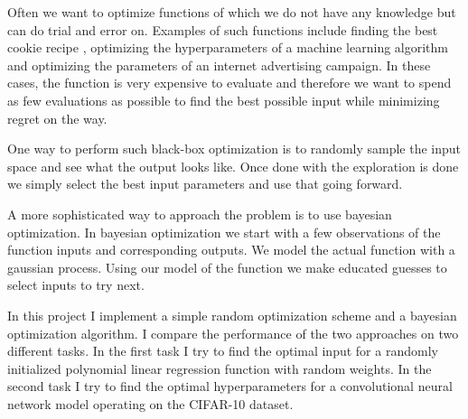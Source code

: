 
Often we want to optimize functions of which we do not have any knowledge but can do trial and error on. Examples of such functions include finding the best cookie recipe \citep{ml-cookies}, optimizing the hyperparameters of a machine learning algorithm and optimizing the parameters of an internet advertising campaign. In these cases, the function is very expensive to evaluate and therefore we want to spend as few evaluations as possible to find the best possible input while minimizing regret on the way.

One way to perform such black-box optimization is to randomly sample the input space and see what the output looks like. Once done with the exploration is done we simply select the best input parameters and use that going forward.

A more sophisticated way to approach the problem is to use bayesian optimization. In bayesian optimization we start with a few observations of the function inputs and corresponding outputs. We model the actual function with a gaussian process. Using our model of the function we make educated guesses to select inputs to try next. \citep{bayesian-opt}

In this project I implement a simple random optimization scheme and a bayesian optimization algorithm. I compare the performance of the two approaches on two different tasks. In the first task I try to find the optimal input for a randomly initialized polynomial linear regression function with random weights. In the second task I try to find the optimal hyperparameters for a convolutional neural network model operating on the CIFAR-10 dataset.


